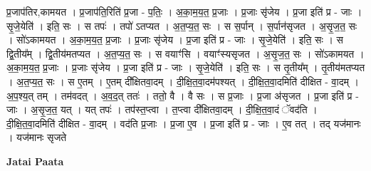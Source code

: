 \documentclass[17pt]{extarticle}
\begin{document}
प्र॒जाप॑तिर,कामयत । प्र॒जाप॑ति॒रिति॑ प्र॒जा - प॒तिः॒ । अ॒का॒म॒य॒त॒ प्र॒जाः । प्र॒जाः सृ॑जेय । प्र॒जा इति॑ प्र - जाः । सृ॒जे॒येति॑ । इति॒ सः । स तपः॑ । तपो॑ ऽतप्यत । अ॒त॒प्य॒त॒ सः । स स॒र्पान् । स॒र्पान॑सृजत । अ॒सृ॒ज॒त॒ सः । सो॑ऽकामयत । अ॒का॒म॒य॒त॒ प्र॒जाः । प्र॒जाः सृ॑जेय । प्र॒जा इति॑ प्र - जाः । सृ॒जे॒येति॑ । इति॒ सः । स द्वि॒तीय᳚म् । द्वि॒तीय॑मतप्यत । अ॒त॒प्य॒त॒ सः । स वयाꣳ॑सि । वयाꣳ॑स्यसृजत । अ॒सृ॒ज॒त॒ सः । सो॑ऽकामयत । अ॒का॒म॒य॒त॒ प्र॒जाः । प्र॒जाः सृ॑जेय । प्र॒जा इति॑ प्र - जाः । सृ॒जे॒येति॑ । इति॒ सः । स तृ॒तीय᳚म् । तृ॒तीय॑मतप्यत । अ॒त॒प्य॒त॒ सः । स ए॒तम् । ए॒तम् दी᳚क्षितवा॒दम् । दी॒क्षि॒त॒वा॒दम॑पश्यत् । दी॒क्षि॒त॒वा॒दमिति॑ दीक्षित - वा॒दम् । अ॒प॒श्य॒त् तम् । तम॑वदत् । अ॒व॒द॒त् ततः॑ । ततो॒ वै । वै सः । स प्र॒जाः । प्र॒जा अ॑सृजत । प्र॒जा इति॑ प्र - जाः । अ॒सृ॒ज॒त॒ यत् । यत् तपः॑ । तप॑स्त॒प्त्वा । त॒प्त्वा दी᳚क्षितवा॒दम् । दी॒क्षि॒त॒वा॒दं ॅवद॑ति । दी॒क्षि॒त॒वा॒दमिति॑ दीक्षित - वा॒दम् । वद॑ति प्र॒जाः । प्र॒जा ए॒व । प्र॒जा इति॑ प्र - जाः । ए॒व तत् । तद् यज॑मानः । यज॑मानः सृजते \newline

\textbf{Jatai Paata} \newline
\end{document}
